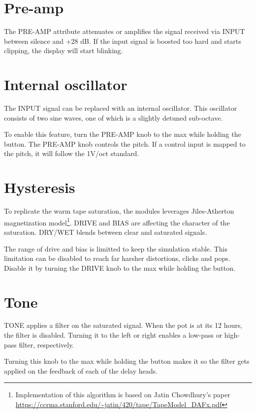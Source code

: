 \documentclass[11pt]{article}
\begin{document}
\begin{minipage}[t]{0.45\textwidth}
\setlength{\parskip}{6pt}
\section{Pre-amp}

The PRE-AMP attribute attenuates or amplifies the signal received via INPUT
between silence and +28 dB. If the input signal is boosted too hard and starts
clipping, the display will start blinking.

\section{Internal oscillator}

The INPUT signal can be replaced with an internal oscillator. This oscillator
consists of two sine waves, one of which is a slightly detuned sub-octave.

To enable this feature, turn the PRE-AMP knob to the max while holding the
button. The PRE-AMP knob controls the pitch. If a control input is mapped to the
pitch, it will follow the 1V/oct standard.

\section{Hysteresis}

To replicate the warm tape saturation, the modules leverages Jiles-Atherton
magnetization model\footnote{
  Implementation of this algorithm is based on Jatin Chowdhury's paper
  \url{https://ccrma.stanford.edu/~jatin/420/tape/TapeModel_DAFx.pdf}
}. DRIVE and BIAS are affecting the character of the saturation. DRY/WET blends
between clear and saturated signals.

The range of drive and bias is limitted to keep the simulation stable. This
limitation can be disabled to reach far harsher distortions, clicks and pops.
Disable it by turning the DRIVE knob to the max while holding the button.

\section{Tone}

TONE applies a filter on the saturated signal. When the pot is at its 12 hours,
the filter is disabled. Turning it to the left or right enables a low-pass or
high-pass filter, respectively.

Turning this knob to the max while holding the button makes it so the filter
gets applied on the feedback of each of the delay heads.

\vspace{5mm}

\end{minipage}%
\end{document}
